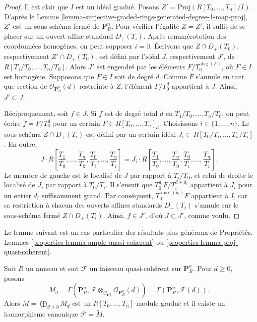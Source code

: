 \begin{proof}
Il est clair que $I$ est un idéal gradué. Posons
$Z' = \text{Proj}(R[T_0, \ldots, T_n]/I)$. D'après le
Lemme \ref{lemma-surjective-graded-rings-generated-degree-1-map-proj}, $Z'$ est
un sous-schéma fermé de $\mathbf{P}^n_R$. Pour vérifier l'égalité $Z = Z'$,
il suffit de se placer sur un ouvert affine standard $D_{+}(T_i)$.
Après renumérotation des coordonnées homogènes, on peut supposer $i = 0$.
Écrivons que $Z \cap D_{+}(T_0)$, respectivement
$Z' \cap D_{+}(T_0)$, est défini par l'idéal $J$, respectivement $J'$, de
$R[T_1/T_0, \ldots, T_n/T_0]$. Alors $J'$ est engendré par les éléments
$F/T_0^{\deg(F)}$, où $F \in I$ est homogène.
Supposons que $F \in I$ soit de degré $d$. Comme $F$ s'annule en tant que
section de $\mathcal{O}_{\mathbf{P}^n_R}(d)$ restreinte à $Z$, l'élément
$F/T_0^d$ appartient à $J$. Ainsi, $J' \subset J$.

\medskip\noindent
Réciproquement, soit $f \in J$. Si $f$ est de degré total $d$ en
$T_1/T_0, \ldots, T_n/T_0$, on peut écrire
$f = F/T_0^d$ pour un certain $F \in R[T_0, \ldots, T_n]_d$.
Choisissons $i \in \{1, \ldots, n\}$. Le sous-schéma
$Z \cap D_{+}(T_i)$ est défini par un certain idéal
$J_i \subset R[T_0/T_i, \ldots, T_n/T_i]$. En outre,
$$
J \cdot
R\left[
\frac{T_1}{T_0}, \ldots, \frac{T_n}{T_0},
\frac{T_0}{T_i}, \ldots, \frac{T_n}{T_i}
\right]
=
J_i \cdot
R\left[
\frac{T_1}{T_0}, \ldots, \frac{T_n}{T_0},
\frac{T_0}{T_i}, \ldots, \frac{T_n}{T_i}
\right].
$$
Le membre de gauche est le localisé de $J$ par rapport à $T_i/T_0$, et celui
de droite le localisé de $J_i$ par rapport à $T_0/T_i$. Il s'ensuit que
$T_0^{d_i}F/T_i^{d + d_i}$ appartient à $J_i$ pour un entier $d_i$
suffisamment grand. Par conséquent, $T_0^{\max(d_i)}F$ appartient à $I$,
car sa restriction à chacun des ouverts affines standards $D_{+}(T_i)$
s'annule sur le sous-schéma fermé $Z \cap D_{+}(T_i)$.
Ainsi, $f \in J'$, d'où $J \subset J'$, comme voulu.
\end{proof}

\noindent
Le lemme suivant est un cas particulier des résultats plus généraux de
Propriétés, Lemmes \ref{properties-lemma-ample-quasi-coherent} ou
\ref{properties-lemma-proj-quasi-coherent}.

\begin{lemma}
\label{lemma-quasi-coherent-projective-space}
Soit $R$ un anneau et soit $\mathcal{F}$ un faisceau quasi-cohérent sur
$\mathbf{P}^n_R$. Pour $d \geq 0$, posons
$$
M_d
=
\Gamma(\mathbf{P}^n_R,
\mathcal{F} \otimes_{\mathcal{O}_{\mathbf{P}^n_R}}
\mathcal{O}_{\mathbf{P}^n_R}(d))
=
\Gamma(\mathbf{P}^n_R, \mathcal{F}(d)).
$$
Alors $M = \bigoplus_{d \geq 0} M_d$ est un
$R[T_0, \ldots, T_n]$-module gradué et il existe un isomorphisme canonique
$\mathcal{F} = \widetilde{M}$.
\end{lemma}


